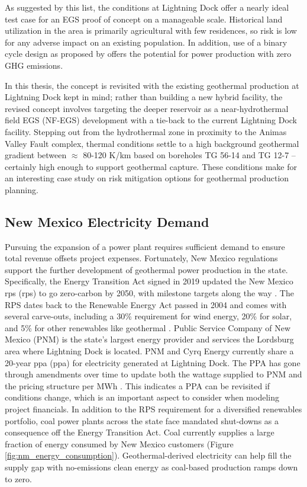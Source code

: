 As suggested by this list, the conditions at Lightning Dock offer a nearly ideal test case for an EGS proof of concept on a manageable scale. Historical land utilization in the area is primarily agricultural with few residences, so risk is low for any adverse impact on an existing population. In addition, use of a binary cycle design as proposed by \citet{schochet_development_2001} offers the potential for power production with zero GHG emissions.  

In this thesis, the \citeauthor{schochet_development_2001} concept is revisited with the existing geothermal production at Lightning Dock kept in mind; rather than building a new hybrid facility, the revised concept involves targeting the deeper reservoir as a near-hydrothermal field EGS (NF-EGS) development with a tie-back to the current Lightning Dock facility. Stepping out from the hydrothermal zone in proximity to the Animas Valley Fault complex, thermal conditions settle to a high background geothermal gradient between $\approx$ 80-120 K/km based on boreholes TG 56-14 and TG 12-7 \citep{cunniff_final_2003} -- certainly high enough to support geothermal capture. These conditions make for an interesting case study on risk mitigation options for geothermal production planning.

\subsection{New Mexico Electricity Demand}
Pursuing the expansion of a power plant requires sufficient demand to ensure total revenue offsets project expenses. Fortunately, New Mexico regulations support the further development of geothermal power production in the state. Specifically, the Energy Transition Act signed in 2019 updated the New Mexico \acrlong{rps} (\acrshort{rps}) to go zero-carbon by 2050, with milestone targets along the way \citep{lillian_new_2019}. The RPS dates back to the Renewable Energy Act passed in 2004 and comes with several carve-outs, including a 30\% requirement for wind energy, 20\% for solar, and 5\% for other renewables like geothermal \citep{dsire_dsire_2021}. Public Service Company of New Mexico (PNM) is the state’s largest energy provider and services the Lordsburg area where Lightning Dock is located. PNM and Cyrq Energy currently share a 20-year \acrlong{ppa} (\acrshort{ppa}) for electricity generated at Lightning Dock. The PPA has gone through amendments over time to update both the wattage supplied to PNM and the pricing structure per MWh \citep[e.g.,][]{pnm_pnm_2014,stanfield_new_2017}. This indicates a PPA can be revisited if conditions change, which is an important aspect to consider when modeling project financials. 
In addition to the RPS requirement for a diversified renewables portfolio, coal power plants across the state face mandated shut-downs as a consequence off the Energy Transition Act. Coal currently supplies a large fraction of energy consumed by New Mexico customers (Figure \ref{fig:nm_energy_consumption}). Geothermal-derived electricity can help fill the supply gap with no-emissions clean energy as coal-based production ramps down to zero.

